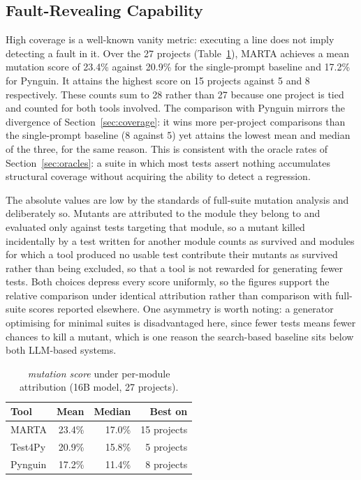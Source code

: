 \documentclass{llncs}
\begin{document}
\subsection{Fault-Revealing Capability}
\label{sec:mutation}

High coverage is a well-known vanity metric: executing a line does not imply
detecting a fault in it. Over the 27 projects (Table~\ref{tab:mutation}), MARTA
achieves a mean mutation score of 23.4\% against 20.9\% for the single-prompt
baseline and 17.2\% for Pynguin. It attains the highest score on 15 projects against
5 and 8 respectively. These counts sum to 28 rather than 27 because one project is tied and
counted for both tools involved. The comparison with Pynguin mirrors the divergence of
Section~\ref{sec:coverage}: it wins more per-project comparisons than the
single-prompt baseline (8 against 5) yet attains the lowest mean and median of the
three, for the same reason. This is consistent with the oracle rates of
Section~\ref{sec:oracles}: a suite in which most tests assert nothing accumulates
structural coverage without acquiring the ability to detect a regression.

The absolute values are low by the standards of full-suite mutation analysis and
deliberately so. Mutants are attributed to the module they belong to and evaluated
only against tests targeting that module, so a mutant killed incidentally by a test
written for another module counts as survived and modules for which a tool produced
no usable test contribute their mutants as survived rather than being excluded, so
that a tool is not rewarded for generating fewer tests. Both choices depress every
score uniformly, so the figures support the relative comparison under identical
attribution rather than comparison with full-suite scores reported elsewhere. One
asymmetry is worth noting: a generator optimising for minimal suites is disadvantaged
here, since fewer tests means fewer chances to kill a mutant, which is one reason the
search-based baseline sits below both LLM-based systems.


\begin{table}[htpb]
\centering
\caption{\emph{mutation score} under per-module attribution (16B model, 27 projects).}
\label{tab:mutation}
\begin{tabular}{lrrr}
\toprule
Tool & Mean & Median & Best on \\
\midrule
MARTA    & 23.4\% & 17.0\% & 15 projects \\
Test4Py  & 20.9\%          & 15.8\%          & 5 projects \\
Pynguin  & 17.2\%          & 11.4\%          & 8 projects \\
\bottomrule
\end{tabular}
\end{table}
\end{document}
